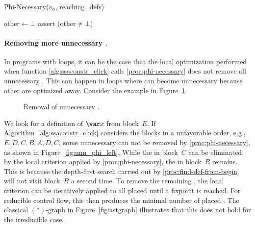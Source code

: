 {\begin{procedure}
  \caption{Phi-Necessary($v_\phi$, reaching\_defs)}
  \label{proc:phi-necessary}
  $\textrm{other} \gets \bot$\;
  assert ($\textrm{other} \ne \bot$)\;
\end{procedure}

\paragraph{Removing more unnecessary \phifuns.}

In programs with loops, it can be the case that the local optimization performed when function \ref{alg:ssaconstr_click} calls \ref{proc:phi-necessary} does not remove all unnecessary \phifuns.
This can happen in loops where \phifuns can become unnecessary because other \phifuns are optimized away.
Consider the example in Figure~\ref{fig:phiopt}.
\begin{figure}[htbp]
	\begin{center}
		\qquad
	\end{center}
	\caption{Removal of unnecessary \phifuns.}
	\label{fig:phiopt}
\end{figure}
We look for a definition of $\var x$ from block~$E$.
If Algorithm~\ref{alg:ssaconstr_click} considers the blocks in a unfavorable order, e.g., $E,D,C,B,A,D,C$, some unnecessary \phifuns can not be removed by \ref{proc:phi-necessary}, as shown in Figure~\ref{fig:unn_phi_left}.
While the \phifun in block~$C$ can be eliminated by the local criterion applied by \ref{proc:phi-necessary}, the \phifun in block~$B$ remains.
This is because the depth-first search carried out by \ref{proc:find-def-from-begin} will not visit block~$B$ a second time.
To remove the remaining \phifuns, the local criterion can be iteratively applied to all placed \phifuns until a fixpoint is reached.
For reducible control flow, this then produces the minimal number of placed \phifuns.
The classical $(\ast)$-graph in Figure~\ref{fig:astgraph} illustrates that this does not hold for the irreducible case.

}
